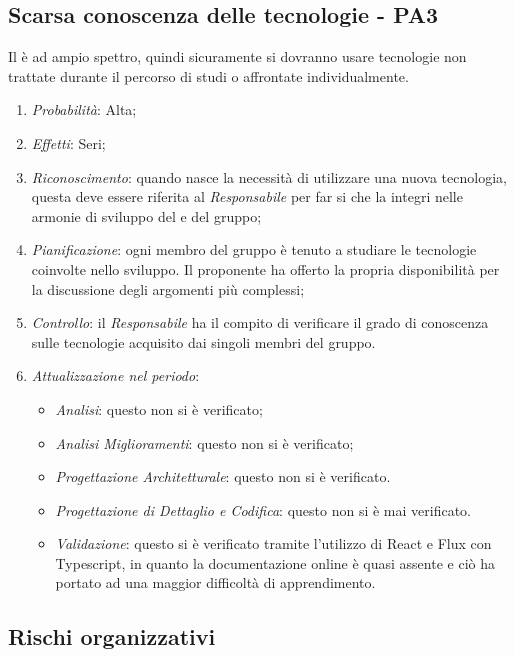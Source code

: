 \subsection{Scarsa conoscenza delle tecnologie - PA3}
Il  \`e ad ampio spettro, quindi sicuramente si dovranno usare tecnologie non trattate durante il percorso di studi o affrontate individualmente.
\begin{enumerate}
\item \textit{Probabilit\`a}: Alta;
\item \textit{Effetti}: Seri;
\item \textit{Riconoscimento}: quando nasce la necessità di utilizzare una nuova tecnologia, questa deve essere riferita al \textit{Responsabile} per far si che la integri nelle armonie di sviluppo del  e del gruppo;
\item \textit{Pianificazione}: ogni membro del gruppo \`e tenuto a studiare le tecnologie coinvolte nello sviluppo. Il proponente ha offerto la propria disponibilit\`a per la discussione degli argomenti pi\`u complessi;
\item \textit{Controllo}: il \textit{Responsabile} ha il compito di verificare il grado di conoscenza sulle tecnologie acquisito dai singoli membri del gruppo.
\item \textit{Attualizzazione nel periodo}: 
	\begin{itemize}
	\item \textit{Analisi}: questo  non si è verificato;
	\item \textit{Analisi Miglioramenti}: questo  non si è verificato;
	\item \textit{Progettazione Architetturale}: questo  non si è verificato.
	\item \textit{Progettazione di Dettaglio e Codifica}: questo  non si è mai verificato.
	\item \textit{Validazione}: questo  si \`e verificato tramite l'utilizzo di React e Flux con Typescript, in quanto la documentazione online è quasi assente e ciò ha portato ad una maggior difficolt\`a di apprendimento.
	\end{itemize}
\end{enumerate}

\subsection{Rischi organizzativi}
